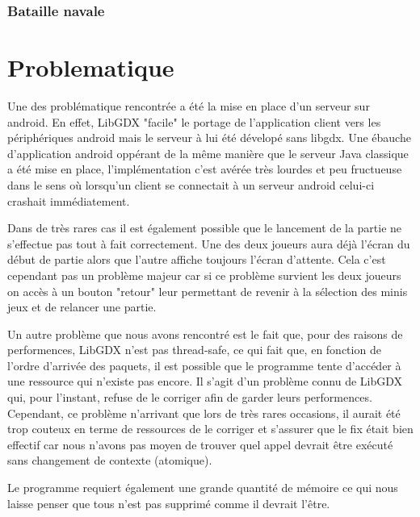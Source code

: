 \documentclass{report}
\begin{document}
\subsection{Bataille navale}





\chapter{Problematique}
Une des problématique rencontrée a été la mise en place d'un serveur sur android. En effet, LibGDX "facile" le portage de l'application client vers les
périphériques android mais le serveur à lui été dévelopé sans libgdx. Une ébauche d'application android oppérant de la même manière que le serveur Java classique a
été mise en place, l'implémentation c'est avérée très lourdes et peu fructueuse dans le sens où lorsqu'un client se connectait à un serveur android celui-ci crashait
immédiatement.

Dans de très rares cas il est également possible que le lancement de la partie ne s'effectue pas tout à fait correctement. Une des deux joueurs aura déjà l'écran du début de partie alors
que l'autre affiche toujours l'écran d'attente. Cela c'est cependant pas un problème majeur car si ce problème survient les deux joueurs on accès à un bouton "retour" leur
permettant de revenir à la sélection des minis jeux et de relancer une partie.

Un autre problème que nous avons rencontré est le fait que, pour des raisons de performences, LibGDX n'est pas thread-safe, ce qui fait que, en fonction de l'ordre d'arrivée des paquets, il est possible que le programme tente d'accéder à une ressource qui n'existe pas encore. Il s'agit d'un problème connu de LibGDX qui, pour l'instant, refuse de le corriger afin de garder leurs performences. Cependant, ce problème n'arrivant que lors de très rares occasions, il aurait été trop couteux en terme de ressources de le corriger et s'assurer que le fix était bien effectif car nous n'avons pas moyen de trouver quel appel devrait être exécuté sans changement de contexte (atomique).

Le programme requiert également une grande quantité de mémoire ce qui nous laisse penser que tous n'est pas supprimé comme il devrait l'être.
\end{document}

